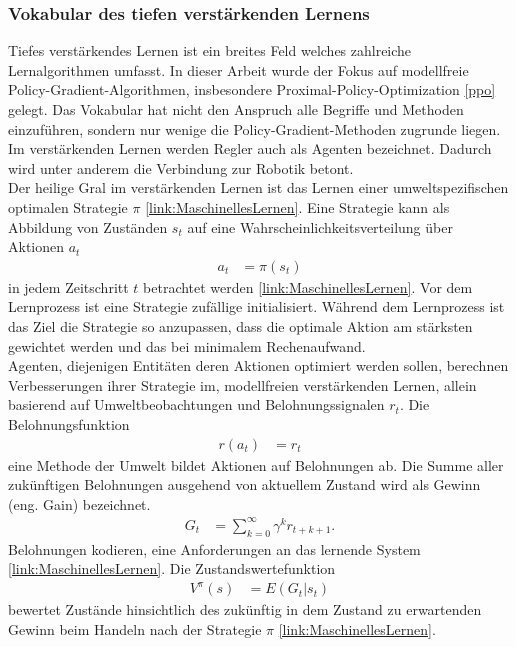 \subsubsection{Vokabular des tiefen verstärkenden Lernens}
Tiefes verstärkendes Lernen ist ein breites Feld welches zahlreiche Lernalgorithmen umfasst. In dieser Arbeit wurde der Fokus auf modellfreie Policy-Gradient-Algorithmen, insbesondere Proximal-Policy-Optimization \ref{ppo} gelegt. Das Vokabular hat nicht den Anspruch alle Begriffe und Methoden einzuführen, sondern nur wenige die Policy-Gradient-Methoden zugrunde liegen.\\
Im verstärkenden Lernen werden Regler auch als Agenten bezeichnet. Dadurch wird unter anderem die Verbindung zur Robotik betont.\\
Der heilige Gral im verstärkenden Lernen ist das Lernen einer umweltspezifischen optimalen Strategie $\pi$ \ref{link:MaschinellesLernen}. Eine Strategie kann als Abbildung von Zuständen $s_t$ auf eine Wahrscheinlichkeitsverteilung über Aktionen $a_t$
\begin{align}
  a_t &= \pi(s_t)
\end{align}
in jedem Zeitschritt $t$ betrachtet werden \ref{link:MaschinellesLernen}. Vor dem Lernprozess ist eine Strategie zufällige initialisiert. Während dem Lernprozess ist das Ziel die Strategie so anzupassen, dass die optimale Aktion am stärksten gewichtet werden und das bei minimalem Rechenaufwand.\\
Agenten, diejenigen Entitäten deren Aktionen optimiert werden sollen, berechnen Verbesserungen ihrer Strategie im, modellfreien verstärkenden Lernen, allein basierend auf Umweltbeobachtungen und Belohnungssignalen $r_t$. Die Belohnungsfunktion
\begin{align}
  r(a_t) &= r_t
\end{align}
eine Methode der Umwelt bildet Aktionen auf Belohnungen ab. Die Summe aller zukünftigen Belohnungen ausgehend von aktuellem Zustand wird als Gewinn (eng. Gain) bezeichnet. 
\begin{align}
  G_t &= \sum_{k = 0}^{\infty}\gamma ^kr_{t+k+1}. 
\end{align}
Belohnungen kodieren, eine Anforderungen an das lernende System \ref{link:MaschinellesLernen}.
Die Zustandswertefunktion
\begin{align}
  V^\pi(s) &= E(G_t | s_t)
\end{align}
bewertet Zustände hinsichtlich des zukünftig in dem Zustand zu erwartenden Gewinn beim Handeln nach der Strategie $\pi$ \ref{link:MaschinellesLernen}.\\

